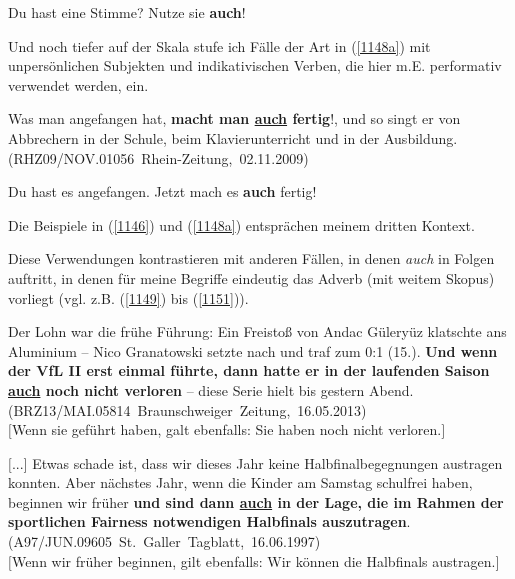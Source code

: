 {\begin{exe}
	\ex\label{1147} 
	Du hast eine Stimme? Nutze sie \textbf{auch}!
\end{exe}
Und noch tiefer auf der Skala stufe ich Fälle der Art in (\ref{1148a}) mit unpersönlichen Subjekten und indikativischen Verben, die hier m.E. performativ verwendet werden, ein.

\begin{exe}
	\ex\label{1148a} 
	\scriptsize
	\glqq Was man angefangen hat, \textbf{macht man \underline{auch} fertig}!\grqq{}, und so singt er von Abbrechern in der Schule, beim Klavierunterricht 		und in der Ausbildung. 
	\newline
	\hbox{}\hfill\hbox{(RHZ09/NOV.01056 Rhein-Zeitung, 02.11.2009)}
\end{exe}

\begin{exe}
	\ex\label{1148} 
	Du hast es angefangen. Jetzt mach es \textbf{auch} fertig!
\end{exe}
Die Beispiele in (\ref{1146}) und (\ref{1148a}) entsprächen meinem dritten Kontext. 

Diese Verwendungen kontrastieren mit anderen Fällen, in denen \textit{auch} in Folgen auftritt, in denen für meine Begriffe eindeutig das Adverb (mit weitem Skopus) vorliegt (vgl. z.B. (\ref{1149}) bis (\ref{1151})).

\begin{exe}
	\scriptsize
	\ex\label{1149} 	
	\scriptsize
	{Der Lohn war die frühe Führung: Ein Freistoß von Andac Güleryüz klatschte ans Aluminium – Nico Granatowski setzte nach und traf zum 0:1 (15.). 				\textbf{Und wenn der VfL II erst einmal führte, dann hatte er in der laufenden Saison \underline{auch} noch nicht verloren} – diese Serie hielt bis 		gestern Abend. 
	\newline
	\hbox{}\hfill\hbox{(BRZ13/MAI.05814 Braunschweiger Zeitung, 16.05.2013)}}\\
	$[$Wenn sie geführt haben, galt ebenfalls: Sie haben noch nicht verloren.$]$
\end{exe}

\begin{exe}
	\ex\label{1150} 
	\scriptsize
	{\glqq $[$...$]$ Etwas schade ist, dass wir dieses Jahr keine Halbfinalbegegnungen austragen konnten. Aber nächstes Jahr, wenn die Kinder am Samstag 		schulfrei haben, beginnen wir früher \textbf{und sind dann \underline{auch} in der Lage, die im Rahmen der sportlichen Fairness notwendigen Halbfinals 		auszutragen}.\grqq{}
	\newline
	\hbox{}\hfill\hbox{(A97/JUN.09605 St. Galler Tagblatt, 16.06.1997)}}\\
	$[$Wenn wir früher beginnen, gilt ebenfalls: Wir können die Halbfinals austragen.$]$
\end{exe}

}
